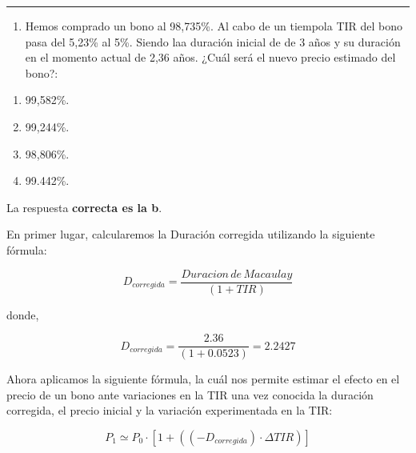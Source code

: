 \documentclass[
  letterpaper,
  DIV=11,
  numbers=noendperiod]{scrreprt}
\providecommand{\tightlist}{%
  \setlength{\itemsep}{0pt}\setlength{\parskip}{0pt}}\usepackage{longtable,booktabs,array}
\begin{document}
\begin{tcolorbox}
\begin{tcolorbox}[enhanced jigsaw, toprule=.15mm, left=2mm, arc=.35mm, breakable, bottomrule=.15mm, opacityback=0, rightrule=.15mm, leftrule=.75mm, colframe=quarto-callout-note-color-frame, colback=white]
\begin{minipage}[t]{\textwidth - 5.5mm}
\end{minipage}%
\end{tcolorbox}

\begin{center}\rule{0.5\linewidth}{0.5pt}\end{center}

\begin{enumerate}
\def\labelenumi{\arabic{enumi}.}
\setcounter{enumi}{7}
\tightlist
\item
  Hemos comprado un bono al 98,735\%. Al cabo de un tiempola TIR del
  bono pasa del 5,23\% al 5\%. Siendo laa duración inicial de de 3 años
  y su duración en el momento actual de 2,36 años. ¿Cuál será el nuevo
  precio estimado del bono?:
\end{enumerate}

\begin{enumerate}
\def\labelenumi{\alph{enumi}.}
\item
  99,582\%.
\item
  99,244\%.
\item
  98,806\%.
\item
  99.442\%.
\end{enumerate}

\begin{tcolorbox}[enhanced jigsaw, toprule=.15mm, left=2mm, arc=.35mm, breakable, bottomrule=.15mm, opacityback=0, rightrule=.15mm, leftrule=.75mm, colframe=quarto-callout-note-color-frame, colback=white]
\begin{minipage}[t]{5.5mm}
\textcolor{quarto-callout-note-color}{\faInfo}
\end{minipage}%
\begin{minipage}[t]{\textwidth - 5.5mm}

La respuesta \textbf{correcta es la b}.

En primer lugar, calcularemos la Duración corregida utilizando la
siguiente fórmula:

\[D_{corregida}=\frac{Duracion\,de\, Macaulay}{\left(1+TIR\right)}\]

donde,

\[D_{corregida}=\frac{2.36}{(1+0.0523)}=2.2427\]

Ahora aplicamos la siguiente fórmula, la cuál nos permite estimar el
efecto en el precio de un bono ante variaciones en la TIR una vez
conocida la duración corregida, el precio inicial y la variación
experimentada en la TIR:

\[P_1\simeq P_0\cdot\left[1+((-D_{corregida})\cdot\Delta TIR)\right]\]


\end{minipage}
\end{tcolorbox}
\end{tcolorbox}
\end{document}
